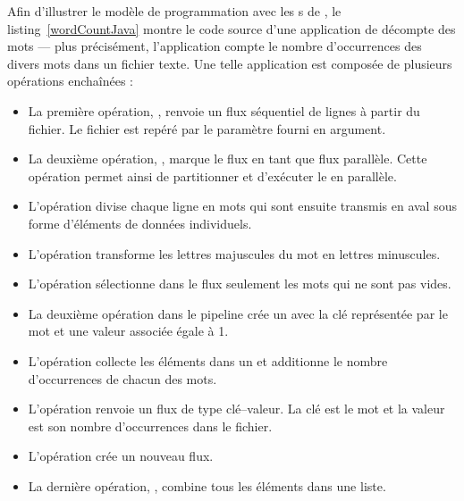 Afin d'illustrer le mod\`ele de programmation avec les s de , le listing~\ref{wordCountJava} montre le code source d'une application de d\'ecompte des mots --- plus pr\'ecis\'ement, l'application compte le nombre d'occurrences des divers mots dans un fichier texte. Une telle application est compos\'ee de plusieurs op\'erations encha\^in\'ees :


\begin{itemize}
	\item La premi\`ere op\'eration, , renvoie un flux s\'equentiel de lignes \`a partir du fichier. Le fichier est rep\'er\'e par le param\`etre  fourni en argument.

	\item La deuxi\`eme op\'eration, , marque le flux en tant que flux parall\`ele. Cette op\'eration permet ainsi de partitionner et d'ex\'ecuter le  en parall\`ele.

	\item L'op\'eration  divise chaque ligne en mots qui sont ensuite transmis en aval sous forme d'\'el\'ements de donn\'ees individuels.
	
	\item L'op\'eration  transforme les lettres majuscules du mot en lettres minuscules.
	
	\item L'op\'eration  s\'electionne dans le flux seulement les mots qui ne sont pas vides.
	
	\item La deuxi\`eme op\'eration  dans le pipeline cr\'ee un  avec la cl\'e repr\'esent\'ee par le mot et une valeur associ\'ee \'egale \`a 1.
	
	\item L'op\'eration  collecte les \'el\'ements dans un  et additionne le nombre d'occurrences de chacun des mots.
	
	\item L'op\'eration  renvoie un flux de type cl\'e--valeur. La cl\'e est le mot et la valeur est son nombre d'occurrences dans le fichier.



	\item L'op\'eration  cr\'ee un nouveau flux.
	
	\item La derni\`ere op\'eration, , combine tous les \'el\'ements dans une liste.
	
	
\end{itemize}




